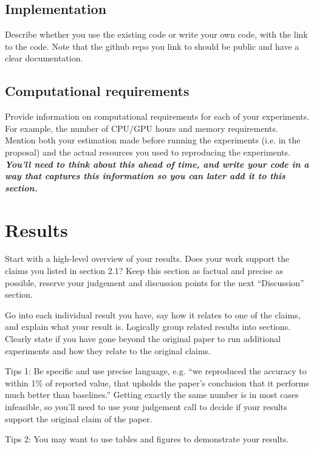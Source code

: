 \documentclass[11pt,a4paper]{article}
\begin{document}
    \subsection{Implementation}
    Describe whether you use the existing code or write your own code, with the link to the code. Note that the github repo you link to should be public and have a clear documentation.

    \subsection{Computational requirements}
    Provide information on computational requirements for each of your experiments. For example, the number of CPU/GPU hours and memory requirements.
    Mention both your estimation made before running the experiments (i.e. in the proposal) and the actual resources you used to reproducing the experiments.
    \textbf{\textit{You'll need to think about this ahead of time, and write your code in a way that captures this information so you can later add it to this section.} }


    \section{Results}
    Start with a high-level overview of your results. Does your work support the claims you listed in section 2.1? Keep this section as factual and precise as possible, reserve your judgement and discussion points for the next ``Discussion'' section.

    Go into each individual result you have, say how it relates to one of the claims, and explain what your result is. Logically group related results into sections. Clearly state if you have gone beyond the original paper to run additional experiments and how they relate to the original claims.

    Tips 1: Be specific and use precise language, e.g. ``we reproduced the accuracy to within 1\% of reported value, that upholds the paper's conclusion that it performs much better than baselines.'' Getting exactly the same number is in most cases infeasible, so you'll need to use your judgement call to decide if your results support the original claim of the paper.

    Tips 2: You may want to use tables and figures to demonstrate your results.

\end{document}

